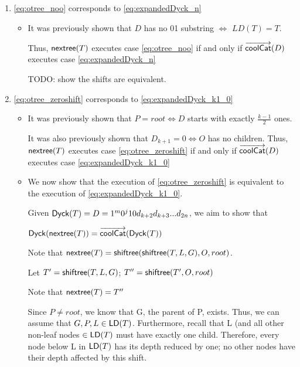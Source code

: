 \begin{enumerate}
    \item \ref{eq:otree_noo} corresponds to \ref{eq:expandedDyck_n}

	\begin{itemize}
	    \item It was previously shown that $D$ has no 01 substring $\iff$ $LD(T)=T$.  

		Thus, $\mathsf{nextree}{(T)}$ executes case \ref{eq:otree_noo} if and only if $\overrightarrow{\mathsf{coolCat}}{(D)}$ executes case  \ref{eq:expandedDyck_n}

		TODO: show the shifts are equivalent.
	\end{itemize}
    \item \ref{eq:otree_zeroshift} corresponds to \ref{eq:expandedDyck_k1_0}

	\begin{itemize}
	    \item It was previously shown that $P=root \iff D$ starts with exactly $\frac{k-1}{2}$ ones.  

		It was also previously shown that $D_{k+1}=0 \iff O$ has no children.  
		Thus, $\mathsf{nextree}{(T)}$ executes case \ref{eq:otree_zeroshift} 
		if and only if $\overrightarrow{\mathsf{coolCat}}{(D)}$ executes case   \ref{eq:expandedDyck_k1_0}

	    \item We now show that the execution of \ref{eq:otree_zeroshift} is equivalent to the execution of    \ref{eq:expandedDyck_k1_0}.

		Given $\mathsf{Dyck}{(T)}=D=1^m0^{j}10d_{k+2}d_{k+3}...d_{2n}$, we aim to show that 

		$\mathsf{Dyck}{(\mathsf{nextree}{(T)})}=\overrightarrow{\mathsf{coolCat}}{(\mathsf{Dyck}{(T)})}$
\bigskip
\bigskip

		Note that $\mathsf{nextree}{(T)}=\mathsf{shiftree(} \mathsf{shiftree(} T, L, G \mathsf{)}, O, root \mathsf{)}$. 




		Let $T'=\mathsf{shiftree(} T, L, G \mathsf{)}$; $T''=\mathsf{shiftree(} T', O, root \mathsf{)}$

		Note that $\mathsf{nextree}{(T)}=T''$

		Since $P \ne root$, we know that G, the parent of P, exists. 
		Thus, we can assume that $G,P,L \in \mathsf{LD}{(T)}$.  Furthermore, recall that L (and all other non-leaf nodes $\in \mathsf{LD}{(T)}$ must have exactly one child.  Therefore, every node below L in $\mathsf{LD}{(T)}$ has its depth reduced by one; no other nodes have their depth affected by this shift.




\end{itemize}
\end{enumerate}
